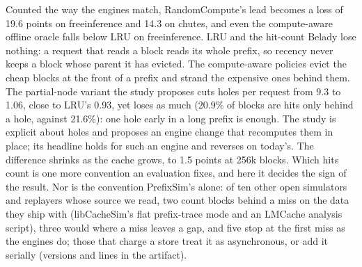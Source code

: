 \noindent Counted the way the engines match, RandomCompute's lead becomes a loss of 19.6 points on
freeinference and 14.3 on chutes, and even the compute-aware offline oracle falls below LRU on freeinference.
LRU and the hit-count Belady lose nothing: a request that reads a block reads its whole prefix, so recency
never keeps a block whose parent it has evicted. The compute-aware policies evict the cheap blocks at the front
of a prefix and strand the expensive ones behind them. The partial-node variant the study proposes cuts holes
per request from 9.3 to 1.06, close to LRU's 0.93, yet loses as much (20.9\% of blocks are hits only behind a
hole, against 21.6\%): one hole early in a long prefix is enough. The study is explicit about holes and
proposes an engine change that recomputes them in place; its headline holds for such an engine and reverses on
today's. The difference shrinks as the cache grows, to 1.5 points at 256k blocks. Which hits count is one more
convention an evaluation fixes, and here it decides the sign of the result. Nor is the convention PrefixSim's
alone: of ten other open simulators and replayers whose source we read, two count blocks behind a miss on the
data they ship with (libCacheSim's flat prefix-trace mode and an LMCache analysis script), three would where a
miss leaves a gap, and five stop at the first miss as the engines do; those that charge a store treat it as
asynchronous, or add it serially (versions and lines in the artifact).

